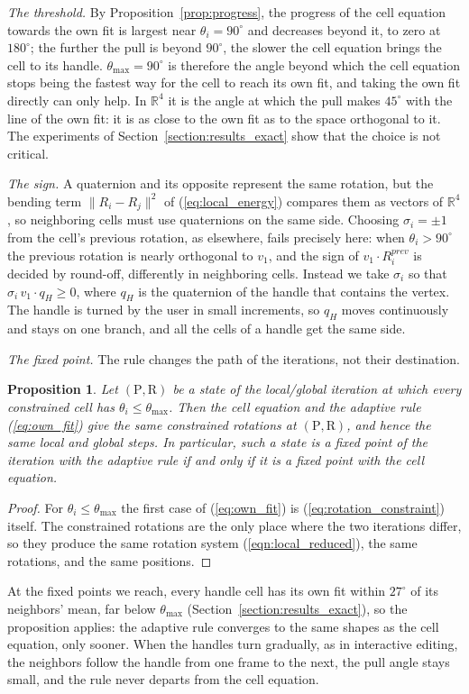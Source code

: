 \documentclass{birkjour}
\newtheorem{prop}[thm]{Proposition}
\theoremstyle{remark}
\numberwithin{equation}{section}
\begin{document}
\emph{The threshold.} By Proposition~\ref{prop:progress}, the progress of the cell equation towards the own fit is largest near $\theta_i = 90^\circ$ and decreases beyond it, to zero at $180^\circ$; the further the pull is beyond $90^\circ$, the slower the cell equation brings the cell to its handle. $\theta_{\max} = 90^\circ$ is therefore the angle beyond which the cell equation stops being the fastest way for the cell to reach its own fit, and taking the own fit directly can only help. In $\mathbb R^4$ it is the angle at which the pull makes $45^\circ$ with the line of the own fit: it is as close to the own fit as to the space orthogonal to it. The experiments of Section~\ref{section:results_exact} show that the choice is not critical.

\emph{The sign.} A quaternion and its opposite represent the same rotation, but the bending term $\|R_i - R_j\|^2$ of (\ref{eq:local_energy}) compares them as vectors of $\mathbb R^4$, so neighboring cells must use quaternions on the same side. Choosing $\sigma_i = \pm 1$ from the cell's previous rotation, as elsewhere, fails precisely here: when $\theta_i > 90^\circ$ the previous rotation is nearly orthogonal to $v_1$, and the sign of $v_1 \cdot R^{prev}_i$ is decided by round-off, differently in neighboring cells. Instead we take $\sigma_i$ so that $\sigma_i \, v_1 \cdot q_H \geq 0$, where $q_H$ is the quaternion of the handle that contains the vertex. The handle is turned by the user in small increments, so $q_H$ moves continuously and stays on one branch, and all the cells of a handle get the same side.

\emph{The fixed point.} The rule changes the path of the iterations, not their destination.
\begin{prop}
\label{prop:same_fixed_point}
Let $(\mathrm P, \mathrm R)$ be a state of the local/global iteration at which every constrained cell has $\theta_i \leq \theta_{\max}$. Then the cell equation and the adaptive rule (\ref{eq:own_fit}) give the same constrained rotations at $(\mathrm P, \mathrm R)$, and hence the same local and global steps. In particular, such a state is a fixed point of the iteration with the adaptive rule if and only if it is a fixed point with the cell equation.
\end{prop}
\begin{proof}
For $\theta_i \leq \theta_{\max}$ the first case of (\ref{eq:own_fit}) is (\ref{eq:rotation_constraint}) itself. The constrained rotations are the only place where the two iterations differ, so they produce the same rotation system (\ref{eqn:local_reduced}), the same rotations, and the same positions.
\end{proof}
At the fixed points we reach, every handle cell has its own fit within $27^\circ$ of its neighbors' mean, far below $\theta_{\max}$ (Section~\ref{section:results_exact}), so the proposition applies: the adaptive rule converges to the same shapes as the cell equation, only sooner. When the handles turn gradually, as in interactive editing, the neighbors follow the handle from one frame to the next, the pull angle stays small, and the rule never departs from the cell equation.
\end{document}
